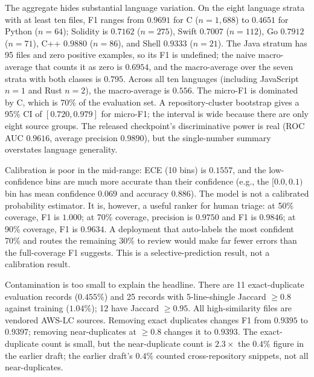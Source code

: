 \documentclass[conference,10pt]{IEEEtran}
\newcommand{\eg}{e.g.}
\begin{document}
The aggregate hides substantial language variation. On the eight language strata with at least
ten files, F1 ranges from $0.9691$ for C ($n=1{,}688$) to $0.4651$ for Python ($n=64$);
Solidity is $0.7162$ ($n=275$), Swift $0.7007$ ($n=112$), Go $0.7912$ ($n=71$), C++ $0.9880$
($n=86$), and Shell $0.9333$ ($n=21$). The Java stratum has 95 files and zero positive examples,
so its F1 is undefined; the naive macro-average that counts it as zero is $0.6954$, and the
macro-average over the seven strata with both classes is $0.795$. Across all ten languages
(including JavaScript $n=1$ and Rust $n=2$), the macro-average is $0.556$. The micro-F1 is
dominated by C, which is 70\% of the evaluation set. A repository-cluster bootstrap gives a 95\%
CI of $[0.720,0.979]$ for micro-F1; the interval is wide because there are only eight source
groups. The released checkpoint's discriminative power is real (ROC AUC $0.9616$, average
precision $0.9890$), but the single-number summary overstates language generality.

Calibration is poor in the mid-range: ECE (10 bins) is $0.1557$, and the low-confidence bins are
much more accurate than their confidence (\eg, the $[0.0,0.1)$ bin has mean confidence $0.069$
and accuracy $0.886$). The model is not a calibrated probability estimator. It is, however, a
useful ranker for human triage: at 50\% coverage, F1 is $1.000$; at 70\% coverage, precision is
$0.9750$ and F1 is $0.9846$; at 90\% coverage, F1 is $0.9634$. A deployment that auto-labels the
most confident 70\% and routes the remaining 30\% to review would make far fewer errors than the
full-coverage F1 suggests. This is a selective-prediction result, not a calibration result.

Contamination is too small to explain the headline. There are 11 exact-duplicate evaluation
records ($0.455\%$) and 25 records with 5-line-shingle Jaccard $\ge0.8$ against training
($1.04\%$); 12 have Jaccard $\ge0.95$. All high-similarity files are vendored AWS-LC sources.
Removing exact duplicates changes F1 from $0.9395$ to $0.9397$; removing near-duplicates at
$\ge0.8$ changes it to $0.9393$. The exact-duplicate count is small, but the near-duplicate
count is $2.3\times$ the $0.4\%$ figure in the earlier draft; the earlier draft's $0.4\%$
counted cross-repository snippets, not all near-duplicates.
\end{document}
